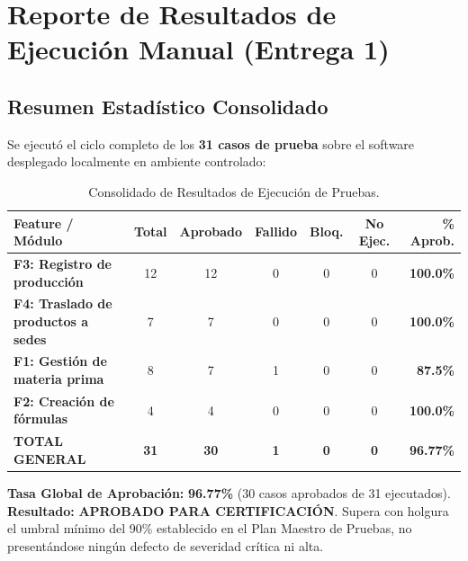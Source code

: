 \documentclass[11pt,a4paper]{article}
\begin{document}
\section{Reporte de Resultados de Ejecución Manual (Entrega 1)}

\subsection{Resumen Estadístico Consolidado}

Se ejecutó el ciclo completo de los \textbf{31 casos de prueba} sobre el software desplegado localmente en ambiente controlado:

\begin{table}[htbp]
\centering
\small
\begin{tabularx}{\textwidth}{X c c c c c r}
\toprule
\textbf{Feature / Módulo} & \textbf{Total} & \textbf{Aprobado} & \textbf{Fallido} & \textbf{Bloq.} & \textbf{No Ejec.} & \textbf{\% Aprob.} \\
\midrule
\textbf{F3: Registro de producción} & 12 & 12 & 0 & 0 & 0 & \textbf{100.0\%} \\
\textbf{F4: Traslado de productos a sedes} & 7 & 7 & 0 & 0 & 0 & \textbf{100.0\%} \\
\textbf{F1: Gestión de materia prima} & 8 & 7 & 1 & 0 & 0 & \textbf{87.5\%} \\
\textbf{F2: Creación de fórmulas} & 4 & 4 & 0 & 0 & 0 & \textbf{100.0\%} \\
\midrule
\textbf{TOTAL GENERAL} & \textbf{31} & \textbf{30} & \textbf{1} & \textbf{0} & \textbf{0} & \textbf{96.77\%} \\
\bottomrule
\end{tabularx}
\caption{Consolidado de Resultados de Ejecución de Pruebas.}\label{tab:resumen_ejecucion}
\end{table}

\begin{tcolorbox}[colback=accentgreen!10,colframe=accentgreen,title=\textbf{Dictamen de Certificación del Sistema}]
\textbf{Tasa Global de Aprobación:} \textbf{96.77\%} (30 casos aprobados de 31 ejecutados).\\
\textbf{Resultado:} \textbf{APROBADO PARA CERTIFICACIÓN}. Supera con holgura el umbral mínimo del 90\% establecido en el Plan Maestro de Pruebas, no presentándose ningún defecto de severidad crítica ni alta.
\end{tcolorbox}
\end{document}
